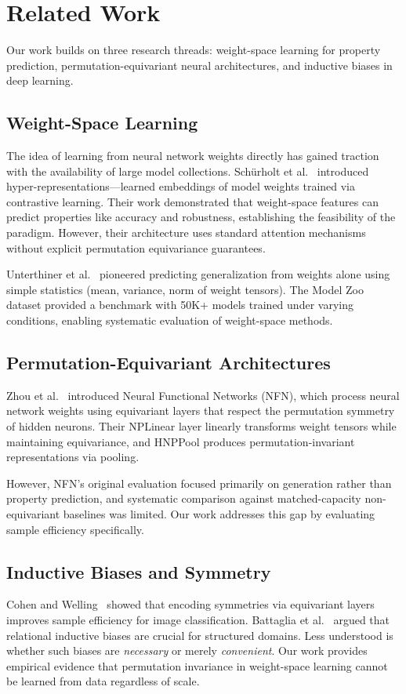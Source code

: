 \section{Related Work}

Our work builds on three research threads: weight-space learning for property prediction, permutation-equivariant neural architectures, and inductive biases in deep learning.

\subsection{Weight-Space Learning}

The idea of learning from neural network weights directly has gained traction with the availability of large model collections. Schürholt et al.~\cite{schurholt2022hyper} introduced hyper-representations---learned embeddings of model weights trained via contrastive learning. Their work demonstrated that weight-space features can predict properties like accuracy and robustness, establishing the feasibility of the paradigm. However, their architecture uses standard attention mechanisms without explicit permutation equivariance guarantees.

Unterthiner et al.~\cite{unterthiner2020predicting} pioneered predicting generalization from weights alone using simple statistics (mean, variance, norm of weight tensors). The Model Zoo dataset \cite{schurholt2022model} provided a benchmark with 50K+ models trained under varying conditions, enabling systematic evaluation of weight-space methods.

\subsection{Permutation-Equivariant Architectures}

Zhou et al.~\cite{zhou2023neural} introduced Neural Functional Networks (NFN), which process neural network weights using equivariant layers that respect the permutation symmetry of hidden neurons. Their NPLinear layer linearly transforms weight tensors while maintaining equivariance, and HNPPool produces permutation-invariant representations via pooling.

However, NFN's original evaluation focused primarily on generation rather than property prediction, and systematic comparison against matched-capacity non-equivariant baselines was limited. Our work addresses this gap by evaluating sample efficiency specifically.

\subsection{Inductive Biases and Symmetry}

Cohen and Welling~\cite{cohen2016group} showed that encoding symmetries via equivariant layers improves sample efficiency for image classification. Battaglia et al.~\cite{battaglia2018relational} argued that relational inductive biases are crucial for structured domains. Less understood is whether such biases are \emph{necessary} or merely \emph{convenient}. Our work provides empirical evidence that permutation invariance in weight-space learning cannot be learned from data regardless of scale.
